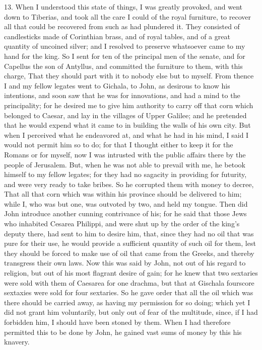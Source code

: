 13. When I understood this state of things, I was greatly provoked, and
went down to Tiberias, and took all the care I could of the royal
furniture, to recover all that could be recovered from such as had
plundered it. They consisted of candlesticks made of Corinthian brass, and
of royal tables, and of a great quantity of uncoined silver; and I
resolved to preserve whatsoever came to my hand for the king. So I sent
for ten of the principal men of the senate, and for Capellus the son of
Antyllus, and committed the furniture to them, with this charge, That they
should part with it to nobody else but to myself. From thence I and my
fellow legates went to Gichala, to John, as desirous to know his
intentions, and soon saw that he was for innovations, and had a mind to
the principality; for he desired me to give him authority to carry off
that corn which belonged to Caesar, and lay in the villages of Upper
Galilee; and he pretended that he would expend what it came to in building
the walls of his own city. But when I perceived what he endeavored at, and
what he had in his mind, I said I would not permit him so to do; for that
I thought either to keep it for the Romans or for myself, now I was
intrusted with the public affairs there by the people of Jerusalem. But,
when he was not able to prevail with me, he betook himself to my fellow
legates; for they had no sagacity in providing for futurity, and were very
ready to take bribes. So he corrupted them with money to decree, That all
that corn which was within his province should be delivered to him; while
I, who was but one, was outvoted by two, and held my tongue. Then did John
introduce another cunning contrivance of his; for he said that those Jews
who inhabited Cesarea Philippi, and were shut up by the order of the
king's deputy there, had sent to him to desire him, that, since they had
no oil that was pure for their use, he would provide a sufficient quantity
of such oil for them, lest they should be forced to make use of oil that
came from the Greeks, and thereby transgress their own laws. Now this was
said by John, not out of his regard to religion, but out of his most
flagrant desire of gain; for he knew that two sextaries were sold with
them of Caesarea for one drachma, but that at Gischala fourscore sextaxies
were sold for four sextaries. So he gave order that all the oil which was
there should be carried away, as having my permission for so doing; which
yet I did not grant him voluntarily, but only out of fear of the
multitude, since, if I had forbidden him, I should have been stoned by
them. When I had therefore permitted this to be done by John, he gained
vast sums of money by this his knavery.

